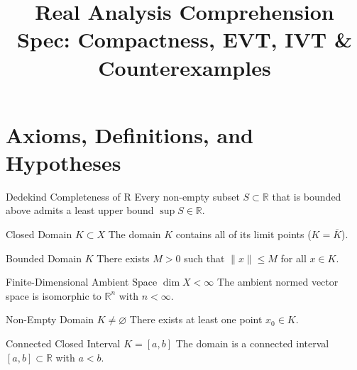 \documentclass[11pt]{article}
\title{Real Analysis Comprehension Spec: Compactness, EVT, IVT \& Counterexamples}
\date{}
\begin{document}
\maketitle

\soundnodirectclaim

\section{Axioms, Definitions, and Hypotheses}

\begin{soundaxiom}[id=ax_real_completeness]{Dedekind Completeness of R}
\label{ax:completeness}
Every non-empty subset $S \subset \mathbb{R}$ that is bounded above admits a least upper bound $\sup S \in \mathbb{R}$.
\soundkanlock
\end{soundaxiom}

\begin{soundhyp}[id=hyp_closed]{Closed Domain $K \subset X$}
\label{hyp:closed}
The domain $K$ contains all of its limit points ($K = \overline{K}$).
\end{soundhyp}

\begin{soundhyp}[id=hyp_bounded]{Bounded Domain $K$}
\label{hyp:bounded}
There exists $M > 0$ such that $\|x\| \le M$ for all $x \in K$.
\end{soundhyp}

\begin{soundhyp}[id=hyp_finite_dim]{Finite-Dimensional Ambient Space $\dim X < \infty$}
\label{hyp:fdim}
The ambient normed vector space is isomorphic to $\mathbb{R}^n$ with $n < \infty$.
\end{soundhyp}

\begin{soundhyp}[id=hyp_nonempty]{Non-Empty Domain $K \neq \varnothing$}
\label{hyp:nonempty}
There exists at least one point $x_0 \in K$.
\end{soundhyp}

\begin{soundhyp}[id=hyp_interval]{Connected Closed Interval $K = [a,b]$}
\label{hyp:interval}
The domain is a connected interval $[a, b] \subset \mathbb{R}$ with $a < b$.
\end{soundhyp}
\end{document}
